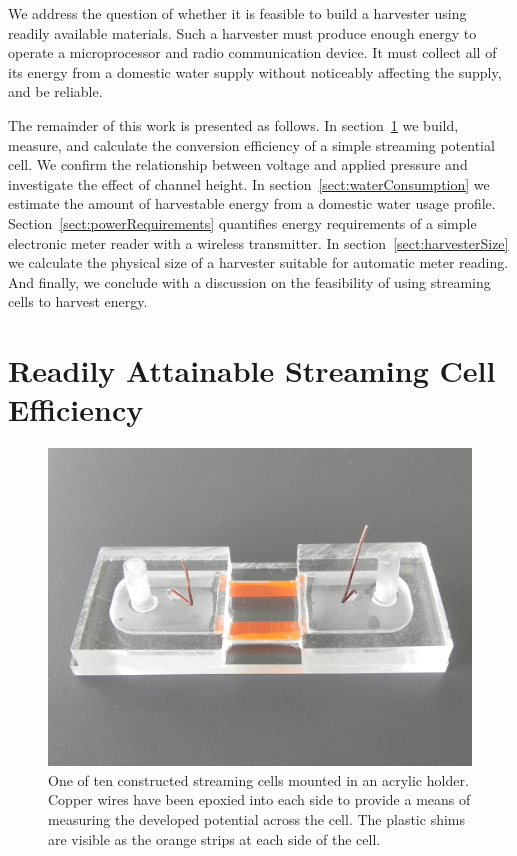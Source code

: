\documentclass[10pt,final,journal]{IEEEtran}
\begin{document}
    We address the question of whether it is feasible to build a harvester using readily available materials.
    Such a harvester must produce enough energy to operate a microprocessor and radio communication device.
    It must collect all of its energy from a domestic water supply without noticeably affecting the supply, and be reliable.

    The remainder of this work is presented as follows.
    In section~\ref{sect:streamingCell} we build, measure, and calculate the conversion efficiency of a simple streaming potential cell.
    We confirm the relationship between voltage and applied pressure and investigate the effect of channel height.
    In section~\ref{sect:waterConsumption} we estimate the amount of harvestable energy from a domestic water usage profile.
    Section~\ref{sect:powerRequirements} quantifies energy requirements of a simple electronic meter reader with a wireless transmitter.
    In section~\ref{sect:harvesterSize} we calculate the physical size of a harvester suitable for automatic meter reading.
    And finally, we conclude with a discussion on the feasibility of using streaming cells to harvest energy.

    \section{Readily Attainable Streaming Cell Efficiency} \label{sect:streamingCell}
    \begin{figure}
        \begin{center}
        \includegraphics[width=\linewidth]{Photo_streamingPotential_Assembly_Step3.JPG}
        \end{center}
        \caption{One of ten constructed streaming cells mounted in an acrylic holder. Copper wires have been epoxied into each side to provide a means of measuring the developed potential across the cell. The plastic shims are visible as the orange strips at each side of the cell.}
        \label{fig:cell}
    \end{figure}
\end{document}
